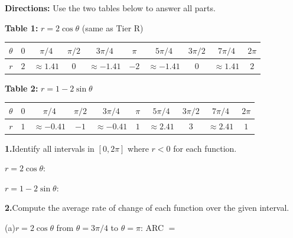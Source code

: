 \documentclass[10pt]{article}
\begin{document}
\begin{tcolorbox}[colback=white, colframe=black!40,
    title=\textbf{Tier A --- Apply},
    fonttitle=\bfseries, arc=2mm, left=3mm, right=3mm, top=2mm, bottom=2mm]

\textbf{Directions:} Use the two tables below to answer all parts.

\textbf{Table 1:} $r = 2\cos\theta$ \hfill (same as Tier R)

\vspace{4pt}
\renewcommand{\arraystretch}{1.4}
\begin{tabular}{|c|c|c|c|c|c|c|c|c|c|}
\hline
$\theta$ & $0$ & $\pi/4$ & $\pi/2$ & $3\pi/4$ & $\pi$ & $5\pi/4$ & $3\pi/2$ & $7\pi/4$ & $2\pi$ \\
\hline
$r$ & $2$ & $\approx 1.41$ & $0$ & $\approx -1.41$ & $-2$ & $\approx -1.41$ & $0$ & $\approx 1.41$ & $2$ \\
\hline
\end{tabular}

\vspace{8pt}
\textbf{Table 2:} $r = 1 - 2\sin\theta$

\vspace{4pt}
\begin{tabular}{|c|c|c|c|c|c|c|c|c|c|}
\hline
$\theta$ & $0$ & $\pi/4$ & $\pi/2$ & $3\pi/4$ & $\pi$ & $5\pi/4$ & $3\pi/2$ & $7\pi/4$ & $2\pi$ \\
\hline
$r$ & $1$ & $\approx -0.41$ & $-1$ & $\approx -0.41$ & $1$ & $\approx 2.41$ & $3$ & $\approx 2.41$ & $1$ \\
\hline
\end{tabular}

\vspace{8pt}
\textbf{1.}\quad Identify all intervals in $[0, 2\pi]$ where $r < 0$ for each function.

\vspace{4pt}
$r = 2\cos\theta$: \underline{\hspace{5cm}}

\vspace{4pt}
$r = 1 - 2\sin\theta$: \underline{\hspace{5cm}}

\vspace{8pt}
\textbf{2.}\quad Compute the average rate of change of each function over the given interval.

\vspace{4pt}
(a)\quad $r = 2\cos\theta$ from $\theta = 3\pi/4$ to $\theta = \pi$:
\quad ARC $= $ \underline{\hspace{4cm}}


\end{tcolorbox}
\end{document}
